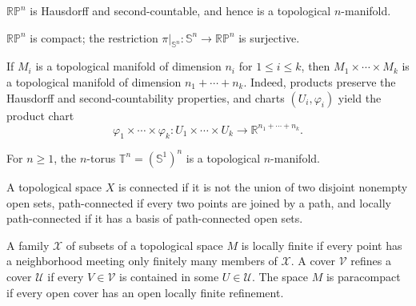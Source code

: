 \begin{proposition}
\label{exer:1-6}
\leanok
{}
$\mathbb{RP}^n$ is Hausdorff and second-countable, and hence is a topological
$n$-manifold.
\end{proposition}

\begin{proposition}
\label{exer:1-7}
\leanok
{}
$\mathbb{RP}^n$ is compact; the restriction
$\pi|_{\mathbb S^n}:\mathbb S^n\to\mathbb{RP}^n$ is surjective.
\end{proposition}

\begin{example}
\label{ex:1-8}
\leanok
{}
If $M_i$ is a topological manifold of dimension $n_i$ for $1\leq i\leq k$,
then $M_1\times\cdots\times M_k$ is a topological manifold of dimension
$n_1+\cdots+n_k$. Indeed, products preserve the Hausdorff and
second-countability properties, and charts $(U_i,\varphi_i)$ yield the product
chart
\[
\varphi_1\times\cdots\times\varphi_k:
U_1\times\cdots\times U_k\longrightarrow\mathbb R^{n_1+\cdots+n_k}.
\]
\end{example}

\begin{example}[Tori]
\label{ex:1-9}
\leanok
{}
For $n\geq1$, the $n$-torus
$\mathbb T^n=(\mathbb S^1)^n$ is a topological $n$-manifold.
\end{example}

\begin{definition}
\label{def:1-extra-3}
\mathlibok
A topological space $X$ is connected if it is not the union of two disjoint
nonempty open sets, path-connected if every two points are joined by a path,
and locally path-connected if it has a basis of path-connected open sets.
\end{definition}

\begin{definition}
\label{def:1-extra-4}
\mathlibok
A family $\mathcal X$ of subsets of a topological space $M$ is locally finite
if every point has a neighborhood meeting only finitely many members of
$\mathcal X$. A cover $\mathcal V$ refines a cover $\mathcal U$ if every
$V\in\mathcal V$ is contained in some $U\in\mathcal U$. The space $M$ is
paracompact if every open cover has an open locally finite refinement.
\end{definition}

